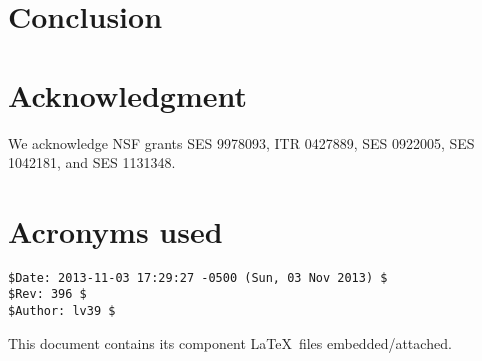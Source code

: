 \documentclass{llncs}
\begin{document}


\section{Conclusion}



\section*{Acknowledgment}

We acknowledge NSF grants SES 9978093, ITR 0427889, SES 0922005, SES 1042181, and SES 1131348.


%


\section*{Acronyms used}


\begin{verbatim}
$Date: 2013-11-03 17:29:27 -0500 (Sun, 03 Nov 2013) $ 
$Rev: 396 $ 
$Author: lv39 $
\end{verbatim}
{\footnotesize
This document contains its component \LaTeX \ files embedded/attached.}
\end{document}
